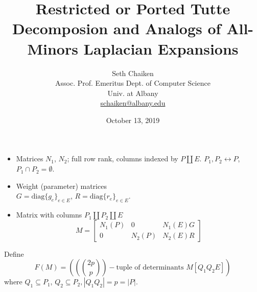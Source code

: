 \documentclass{beamer}
\title{Restricted or Ported Tutte Decomposion and Analogs
  of All-Minors Laplacian Expansions}
\author{Seth Chaiken\\
  Assoc. Prof. Emeritus Dept. of Computer Science\\
Univ. at Albany\\
\url{schaiken@albany.edu}
}
\date{October 13, 2019}
\newcommand{\dunion}{\coprod}
\begin{document}
\begin{frame}
 \titlepage
\end{frame}


\begin{frame}
  \begin{itemize}
  \item
    Matrices $N_1$, $N_2$; full row rank, columns indexed by
    $P\dunion E$.  $P_1,P_2\leftrightarrow P$, $P_1\cap P_2=\emptyset$.
  \item
    Weight (parameter) matrices\\
    $G=\text{diag}\{g_e\}_{e\in E} $,
    $R=\text{diag}\{r_e\}_{e\in E} $.
  \item
    Matrix with columns $P_1 \dunion P_2 \dunion E$
    \[
M = \left[\begin{array}{c|c|c} N_1(P)  &  0  &  N_1(E)G \\  \hline
0  & N_2(P)  &  N_2(E)R \end{array}\right]
    \]
  \end{itemize}

  Define
  \[
  F(M)=((\binom{2p}{p})-\text{tuple of determinants\ } M[Q_1Q_2E])
  \]
  where $Q_1\subseteq P_1$, $Q_2\subseteq P_2, |Q_1Q_2|=p=|P|$.
    
\end{frame}
\end{document}
